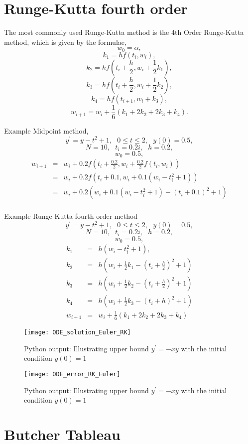 \section{Runge-Kutta fourth order}
The most commonly used Runge-Kutta method is the 4th Order Runge-Kutta method, which is given by the formulae,
\[w_0 = \alpha, \]
\[k_1 = hf(t_i,w_i), \]
\[k_2 = hf(t_i+\frac{h}{2},w_i+\frac{1}{2}k_1), \]
\[k_3 = hf(t_i+\frac{h}{2},w_i+\frac{1}{2}k_2), \]
\[k_4 = hf(t_{i+1},w_i+k_3), \]
\[w_{i+1}=w_{i}+\frac{1}{6}(k_1+2k_2+2k_3+k_4). \]
\begin{example}
Example Midpoint method,
\[y^{'}=y-t^2+1, \ \ \ 0 \leq t \leq 2, \ \ \ y(0)=0.5, \]
\[N=10, \ \ \ t_i=0.2i, \ \ \ h=0.2, \]
\[w_0=0.5, \]
\begin{eqnarray*}
w_{i+1} &=& w_{i} + 0.2f(t_i+\frac{0.2}{2},w_i+\frac{0.2}{2}f(t_i,w_i))\\
 &=& w_{i} + 0.2f(t_i+0.1,w_i+0.1(w_i-t^2_i+1))\\
 &=& w_{i} + 0.2(w_i+0.1(w_i-t^2_i+1)-(t_i+0.1)^2+1)\\
\end{eqnarray*}
\end{example}

\begin{example}
Example Runge-Kutta fourth order method
\[y^{'}=y-t^2+1, \ \ \ 0 \leq t \leq 2, \ \ \ y(0)=0.5, \]
\[N=10, \ \ \ t_i=0.2i, \ \ \ h=0.2, \]
\[w_0=0.5, \]
\begin{eqnarray*}
k_1&=&h(w_i-t_i^2+1),\\
k_2&=&h(w_i+\frac{1}{2}k_1-(t_i+\frac{h}{2})^2+1)\\
k_3&=&h(w_i+\frac{1}{2}k_2-(t_i+\frac{h}{2})^2+1)\\
k_4&=&h(w_i+\frac{1}{2}k_3-(t_i+h)^2+1)\\
w_{i+1} &=& w_{i} + \frac{1}{6}(k_1+2k_2+2k_3+k_4)
\end{eqnarray*}
\begin{figure}[H]
\centering
\texttt{[image: ODE\_solution\_Euler\_RK]}
\caption{Python output: Illustrating upper bound $y^{'}=-xy$ with the initial condition $y(0)=1$ }
\label{RK vs Euler Figure}
\end{figure}
\begin{figure}[H]
\centering
\texttt{[image: ODE\_error\_RK\_Euler]}
\caption{Python output: Illustrating upper bound $y^{'}=-xy$ with the initial condition $y(0)=1$ }
\label{Modified Euler Figure}
\end{figure}
\end{example}
\section{Butcher Tableau}

